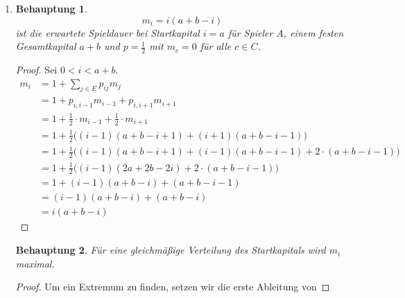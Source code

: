 \documentclass[a4paper]{scrartcl}
\newtheorem*{behaupt}{Behauptung}
\def \blattnr {3}
\begin{document}
\begin{enumerate}[label=\bfseries \blattnr.\arabic*]
\begin{enumerate}
           \item
               \begin{behaupt}
                   \begin{equation*}
                       m_i = i(a+b-i)
                   \end{equation*}
                   ist die erwartete Spieldauer bei Startkapital $i = a$ für
                   Spieler $A$, einem festen Gesamtkapital $a+b$ und $p =
                   \frac{1}{2}$ mit $m_c = 0$ für alle $c \in C$.
               \end{behaupt}
               \begin{proof}
                   Sei $0 < i < a + b$.
                   \begin{equation*}
                       \begin{split}
                           m_i &= 1 + \sum_{j \in E} p_{ij}m_j \\
                               &= 1 + p_{i,i-1}m_{i-1} + p_{i,i+1}m_{i+1} \\
                               &= 1 + \frac{1}{2} \cdot m_{i-1} + \frac{1}{2}
                                    \cdot m_{i+1} \\
                               &= 1 + \frac{1}{2} \Big( (i-1)(a+b-i+1) +
                                    (i+1)(a+b-i-1) \Big) \\
                               &= 1 + \frac{1}{2} \Big( (i-1)(a+b-i+1) +
                                    (i-1)(a+b-i-1) + 2 \cdot (a+b-i-1) \Big) \\
                               &= 1 + \frac{1}{2} \Big( (i-1)(2a+2b-2i) +
                                    2 \cdot (a+b-i-1) \Big) \\
                               &= 1 + (i-1)(a+b-i) + (a+b-i-1) \\
                               &= (i-1)(a+b-i) + (a+b-i) \\
                               &= i(a+b-i)
                       \end{split}
                   \end{equation*}
               \end{proof}
               \begin{behaupt}
                   Für eine gleichmäßige Verteilung des Startkapitals wird
                   $m_i$ maximal.
               \end{behaupt}
               \begin{proof}
                   Um ein Extremum zu finden, setzen wir die erste Ableitung von

\end{proof}
\end{enumerate}
\end{enumerate}
\end{document}
